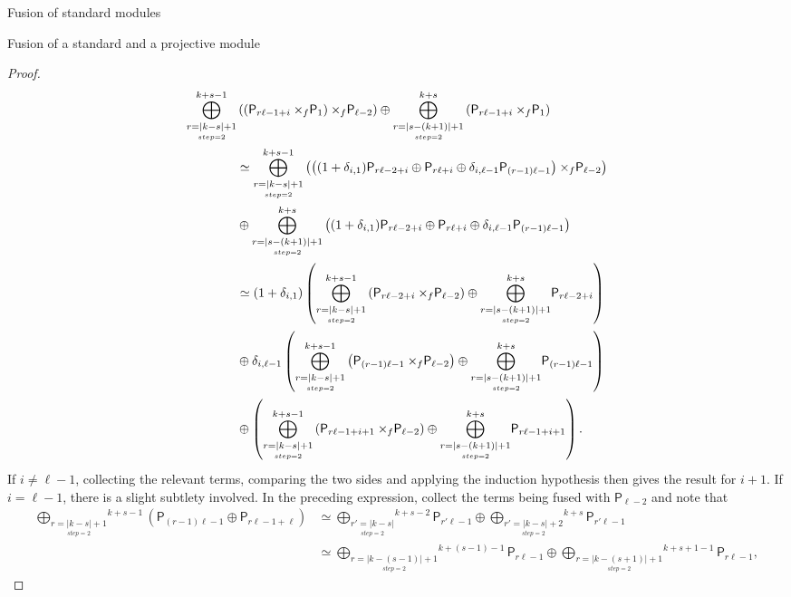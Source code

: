 \documentclass[reqno]{amsart}
\newcommand{\dP}[1]{\mathsf P_{#1}}
\newcommand{\xf}{\times\hspace{-0.27em}_f}
\newcommand{\lc}{\ell}
\begin{document}
\begin{section}{Fusion of standard modules}
\begin{subsection}{Fusion of a standard and a projective module}
\begin{proof}
\begin{align*}
	\overset{k+s-1}{\underset{\underset{step =2}{r = |k-s| + 1}}{\bigoplus}}&\left( \left(\dP{r \lc -1+i}\xf \dP{1} \right) \xf \dP{\lc-2}\right) \oplus \overset{k+s}{\underset{\underset{step =2}{r = |s-(k+1)| + 1}}{\bigoplus}}\left( \dP{r \lc -1+i} \xf \dP{1} \right)\\
	& \simeq \overset{k+s-1}{\underset{\underset{step =2}{r = |k-s| + 1}}{\bigoplus}}\left( \left((1+\delta_{i,1})\dP{r \lc -2+i} \oplus \dP{r \lc + i}  \oplus \delta_{i,\lc -1}\dP{(r-1)\lc -1}\right) \xf \dP{\lc-2}\right)\\
	&\oplus \overset{k+s}{\underset{\underset{step =2}{r = |s-(k+1)| + 1}}{\bigoplus}}\left((1+\delta_{i,1}) \dP{r \lc -2+i} \oplus \dP{r\lc +i} \oplus \delta_{i,\lc-1} \dP{(r-1)\lc -1}\right)\\
	& \simeq (1+\delta_{i,1})\left(\overset{k+s-1}{\underset{\underset{step =2}{r = |k-s| + 1}}{\bigoplus}}\left(\dP{r \lc -2+i} \xf \dP{\lc -2} \right) \oplus \overset{k+s}{\underset{\underset{step =2}{r = |s-(k+1)| + 1}}{\bigoplus}}\dP{r \lc -2+i}\right)\\
	&\oplus \delta_{i,\lc-1} \left(\overset{k+s-1}{\underset{\underset{step =2}{r = |k-s| + 1}}{\bigoplus}}\left(\dP{(r-1)\lc -1}\xf \dP{\lc-2}\right) \oplus \overset{k+s}{\underset{\underset{step =2}{r = |s-(k+1)| + 1}}{\bigoplus}}  \dP{(r-1)\lc -1} \right)\\
	& \oplus \left(\overset{k+s-1}{\underset{\underset{step =2}{r = |k-s| + 1}}{\bigoplus}}\left(\dP{r \lc -1+i+1} \xf \dP{\lc -2} \right) \oplus \overset{k+s}{\underset{\underset{step =2}{r = |s-(k+1)| + 1}}{\bigoplus}}\dP{r \lc -1+i+1}\right).
\end{align*}
If $i \neq \lc -1 $, collecting the relevant terms, comparing the two sides and applying the induction hypothesis then gives the result for $i+1$. If $i =\lc-1 $, there is a slight subtlety involved. In the preceding expression, collect the terms being fused with $\dP{\lc -2}$ and note that
\begin{align*}
	\overset{k+s-1}{\underset{\underset{step =2}{r = |k-s| + 1}}{\bigoplus}}\left(\dP{(r-1)\lc -1} \oplus \dP{r \lc -1+\lc } \right)& \simeq \overset{k+s-2}{\underset{\underset{step =2}{r' = |k-s|}}{\bigoplus}} \dP{r'\lc -1} \oplus \overset{k+s}{\underset{\underset{step =2}{r' = |k-s|+2}}{\bigoplus}} \dP{r'\lc -1}\\
	& \simeq \overset{k+(s-1)-1}{\underset{\underset{step =2}{r = |k-(s-1)| + 1}}{\bigoplus}} \dP{r \lc -1} \oplus \overset{k+s+1-1}{\underset{\underset{step =2}{r = |k-(s+1)| + 1}}{\bigoplus}} \dP{r \lc -1},

\end{align*}
\end{proof}
\end{subsection}
\end{section}
\end{document}
